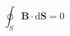 \documentclass[
	12pt, %
	a4paper, %
]{myLegrandOrangeBook}
\newcommand{\rmd}{\mathrm{d}}
\begin{document}
\begin{theorem}[有磁介质存在时的高斯定理]
    \begin{equation}
        \oint_S \boldsymbol{B} \cdot \rmd \boldsymbol{S} = 0
    \end{equation}
\end{theorem}



\end{document}
